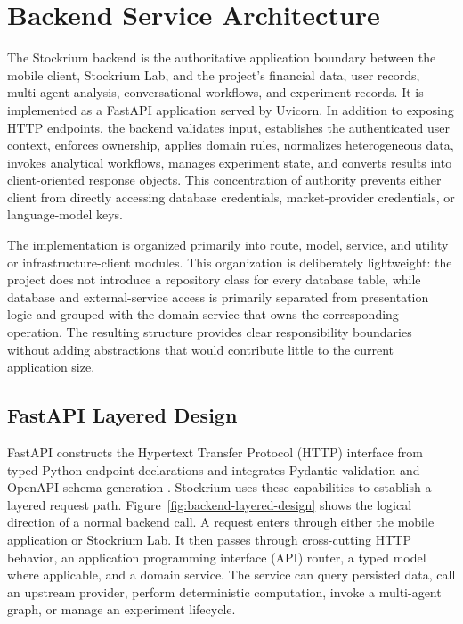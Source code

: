 \section{Backend Service Architecture}
\label{sec:backend-service-architecture}

The Stockrium backend is the authoritative application boundary between the mobile client, Stockrium Lab, and the project's financial data, user records, multi-agent analysis, conversational workflows, and experiment records. It is implemented as a FastAPI application served by Uvicorn. In addition to exposing HTTP endpoints, the backend validates input, establishes the authenticated user context, enforces ownership, applies domain rules, normalizes heterogeneous data, invokes analytical workflows, manages experiment state, and converts results into client-oriented response objects. This concentration of authority prevents either client from directly accessing database credentials, market-provider credentials, or language-model keys.

The implementation is organized primarily into route, model, service, and utility or infrastructure-client modules. This organization is deliberately lightweight: the project does not introduce a repository class for every database table, while database and external-service access is primarily separated from presentation logic and grouped with the domain service that owns the corresponding operation. The resulting structure provides clear responsibility boundaries without adding abstractions that would contribute little to the current application size.

\subsection{FastAPI Layered Design}
\label{subsec:fastapi-layered-design}

FastAPI constructs the Hypertext Transfer Protocol (HTTP) interface from typed Python endpoint declarations and integrates Pydantic validation and OpenAPI schema generation \cite{fastapiFeatures2026}. Stockrium uses these capabilities to establish a layered request path. Figure~\ref{fig:backend-layered-design} shows the logical direction of a normal backend call. A request enters through either the mobile application or Stockrium Lab. It then passes through cross-cutting HTTP behavior, an application programming interface (API) router, a typed model where applicable, and a domain service. The service can query persisted data, call an upstream provider, perform deterministic computation, invoke a multi-agent graph, or manage an experiment lifecycle.

